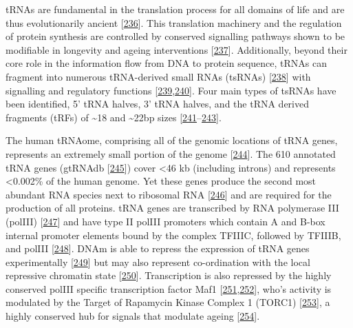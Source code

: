 \documentclass[
]{book}
\begin{document}
tRNAs are fundamental in the translation process for all domains of life and are thus evolutionarily ancient {[}\protect\hyperlink{ref-Eigen1989}{236}{]}.
This translation machinery and the regulation of protein synthesis are controlled by conserved signalling pathways shown to be modifiable in longevity and ageing interventions {[}\protect\hyperlink{ref-Tavernarakis2008}{237}{]}.
Additionally, beyond their core role in the information flow from DNA to protein sequence, tRNAs can fragment into numerous tRNA-derived small RNAs (tsRNAs) {[}\protect\hyperlink{ref-Pliatsika2018}{238}{]} with signalling and regulatory functions {[}\protect\hyperlink{ref-Schimmel2017}{239},\protect\hyperlink{ref-Lee2009}{240}{]}.
Four main types of tsRNAs have been identified, 5' tRNA halves, 3' tRNA halves, and the tRNA derived fragments (tRFs) of \textasciitilde18 and \textasciitilde22bp sizes {[}\protect\hyperlink{ref-Torres2019}{241}--\protect\hyperlink{ref-Xu2017a}{243}{]}.

The human tRNAome, comprising all of the genomic locations of tRNA genes, represents an extremely small portion of the genome {[}\protect\hyperlink{ref-Parisien2013}{244}{]}.
The 610 annotated tRNA genes (gtRNAdb {[}\protect\hyperlink{ref-Chan2009}{245}{]}) cover \textless46 kb (including introns) and represents \textless0.002\% of the human genome.
Yet these genes produce the second most abundant RNA species next to ribosomal RNA {[}\protect\hyperlink{ref-Lodish2000}{246}{]} and are required for the production of all proteins.
tRNA genes are transcribed by RNA polymerase III (polIII) {[}\protect\hyperlink{ref-Schramm2002}{247}{]} and have type II polIII promoters which contain A and B-box internal promoter elements bound by the complex TFIIIC, followed by TFIIIB, and polIII {[}\protect\hyperlink{ref-Canella2010}{248}{]}.
DNAm is able to repress the expression of tRNA genes experimentally {[}\protect\hyperlink{ref-Besser1990}{249}{]} but may also represent co-ordination with the local repressive chromatin state {[}\protect\hyperlink{ref-Varshney2015}{250}{]}.
Transcription is also repressed by the highly conserved polIII specific transcription factor Maf1 {[}\protect\hyperlink{ref-Murawski1994}{251},\protect\hyperlink{ref-Pluta2001}{252}{]}, who's activity is modulated by the Target of Rapamycin Kinase Complex 1 (TORC1) {[}\protect\hyperlink{ref-Mange2017}{253}{]}, a highly conserved hub for signals that modulate ageing {[}\protect\hyperlink{ref-Kennedy2016}{254}{]}.
\end{document}
